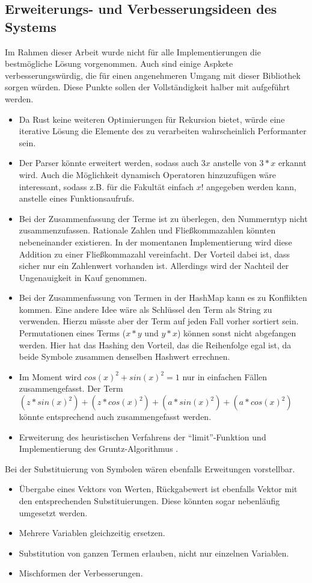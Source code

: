 \documentclass[11pt,a4paper, ngerman]{article}
\begin{document}
\subsection{Erweiterungs- und Verbesserungsideen des Systems}
Im Rahmen dieser Arbeit wurde nicht für alle Implementierungen die bestmögliche Lösung vorgenommen. Auch sind einige Aspkete verbesserungswürdig, die für einen angenehmeren Umgang mit dieser Bibliothek sorgen würden. Diese Punkte sollen der Vollständigkeit halber mit aufgeführt werden.
\begin{itemize}
    \item Da Rust keine weiteren Optimierungen für Rekursion bietet, würde eine iterative Lösung die Elemente des  zu verarbeiten wahrscheinlich Performanter sein.
    \item Der Parser könnte erweitert werden, sodass auch $3x$ anstelle von $3*x$ erkannt wird. Auch die Möglichkeit dynamisch Operatoren hinzuzufügen wäre interessant, sodass z.B. für die Fakultät einfach $x!$ angegeben werden kann, anstelle eines Funktionsaufrufs.
    \item Bei der Zusammenfassung der Terme ist zu überlegen, den Nummerntyp nicht zusammenzufassen. Rationale Zahlen und Fließkommazahlen könnten nebeneinander existieren. In der momentanen Implementierung wird diese Addition zu einer Fließkommazahl vereinfacht. Der Vorteil dabei ist, dass sicher nur ein Zahlenwert vorhanden ist. Allerdings wird der Nachteil der Ungenauigkeit in Kauf genommen.
    \item Bei der Zusammenfassung von Termen in der HashMap kann es zu Konflikten kommen. Eine andere Idee wäre als Schlüssel den Term als String zu verwenden. Hierzu müsste aber der Term auf jeden Fall vorher sortiert sein. Permutationen eines Terms ($x*y$ und $y*x$) können sonst nicht abgefangen werden. Hier hat das Hashing den Vorteil, das die Reihenfolge egal ist, da beide Symbole zusammen denselben Hashwert errechnen.
    \item Im Moment wird $cos(x)^2+sin(x)^2 = 1$ nur in einfachen Fällen zusammengefasst. Der Term $(z*sin(x)^2)+(z*cos(x)^2) + (a*sin(x)^2)+(a*cos(x)^2)$ könnte entsprechend auch zusammengefasst werden.
    \item Erweiterung des heuristischen Verfahrens der ``limit''-Funktion und Implementierung des Gruntz-Algorithmus \cite{GruntzPdf}.
\end{itemize}

Bei der Substituierung von Symbolen wären ebenfalls Erweitungen vorstellbar.
\begin{itemize}
    \item Übergabe eines Vektors von Werten, Rückgabewert ist ebenfalls Vektor mit den entsprechenden Substituierungen. Diese könnten sogar nebenläufig umgesetzt werden.
    \item Mehrere Variablen gleichzeitig ersetzen.
    \item Substitution von ganzen Termen erlauben, nicht nur einzelnen Variablen.
    \item Mischformen der Verbesserungen.
\end{itemize}
\end{document}
